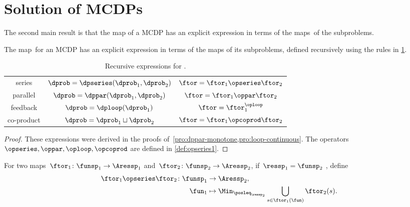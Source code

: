 

\section{Solution of MCDPs}
\label{sec:Solution-of-Monotone}
The second main result is that the map \ftor of a MCDP has an explicit
expression in terms of the maps~\ftor of the subproblems.


\begin{theorem}
    \label{thm:CDP-solvig}The map~\ftor for an MCDP has an explicit
    expression in terms of the maps \ftor of its subproblems, defined
    recursively using the rules in \cref{tab:correspondence}.
\end{theorem}

\begin{table}[h]
    \caption{Recursive expressions for \ftor.}
    \label{tab:correspondence}
    \centering{}\setlength\extrarowheight{5pt}\normalsize
    \begin{tabular}{ccc}
        series & $\dprob=\dpseries(\dprob_{1},\dprob_{2})$ & $\ftor=\ftor_{1}\opseries\ftor_{2}$\tabularnewline
        parallel & $\dprob=\dppar(\dprob_{1},\dprob_{2})$ & $\ftor=\ftor_{1}\oppar\ftor_{2}$\tabularnewline
        feedback & $\dprob=\dploop(\dprob_{1})$ & $\ftor=\ftor_{1}^{\oploop}$\tabularnewline
        co-product & $\dprob=\dprob_{1}\sqcup\dprob_{2}$ & $\ftor=\ftor_{1}\opcoprod\ftor_{2}$\tabularnewline
    \end{tabular}
\end{table}

\begin{proof}
    These expressions were derived in the proofs of~\cref{pro:dppar-monotone,pro:loop-continuous}.
    The operators $\opseries,\oppar,\oploop,\opcoprod$ are defined
    in \cref{def:opseries1}.
\end{proof}
\begin{definition}
    \label{def:opseries1}
    For two maps~$\ftor_{1}\colon\funsp_{1}\rightarrow\Aressp_{1}$
    and~$\ftor_{2}\colon\funsp_{2}\rightarrow\Aressp_{2}$, if~$\ressp_{1}=\funsp_{2}$
    , define
    \begin{align*}
    {\displaystyle \ftor_{1}\opseries\ftor_{2}\colon\funsp_{1}}
        & \rightarrow\Aressp_{2},\\
        \fun_{1} & \mapsto\Min_{\posleq_{\ressp_{2}}}\bigcup_{s\in\ftor_{1}(\fun)}\ftor_{2}(s).
    \end{align*}
\end{definition}

